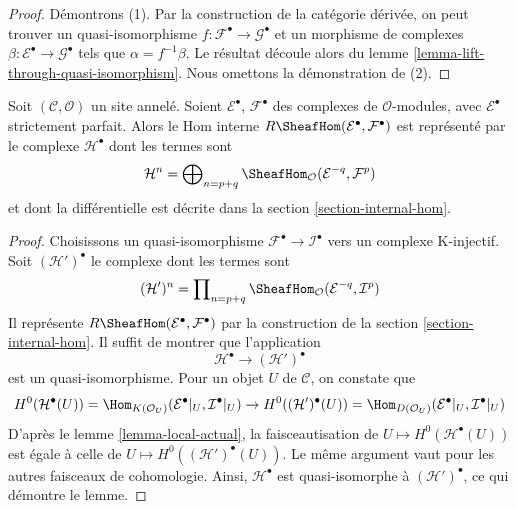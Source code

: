 \begin{proof}
Démontrons (1). Par la construction de la catégorie dérivée, on peut trouver
un quasi-isomorphisme
$f : \mathcal{F}^\bullet \to \mathcal{G}^\bullet$ et un morphisme de
complexes $\beta : \mathcal{E}^\bullet \to \mathcal{G}^\bullet$ tels que
$\alpha = f^{-1}\beta$. Le résultat découle alors du lemme
\ref{lemma-lift-through-quasi-isomorphism}. Nous omettons la démonstration de
(2).
\end{proof}

\begin{lemma}
\label{lemma-Rhom-strictly-perfect}
Soit $(\mathcal{C}, \mathcal{O})$ un site annelé. Soient
$\mathcal{E}^\bullet$, $\mathcal{F}^\bullet$ des complexes de
$\mathcal{O}$-modules, avec $\mathcal{E}^\bullet$ strictement parfait. Alors le
Hom interne $R\SheafHom(\mathcal{E}^\bullet, \mathcal{F}^\bullet)$ est
représenté par le complexe $\mathcal{H}^\bullet$ dont les termes sont
$$
\mathcal{H}^n =
\bigoplus\nolimits_{n = p + q}
\SheafHom_\mathcal{O}(\mathcal{E}^{-q}, \mathcal{F}^p)
$$
et dont la différentielle est décrite dans la section
\ref{section-internal-hom}.
\end{lemma}

\begin{proof}
Choisissons un quasi-isomorphisme
$\mathcal{F}^\bullet \to \mathcal{I}^\bullet$ vers un complexe K-injectif.
Soit $(\mathcal{H}')^\bullet$ le complexe dont les termes sont
$$
(\mathcal{H}')^n =
\prod\nolimits_{n = p + q}
\SheafHom_\mathcal{O}(\mathcal{E}^{-q}, \mathcal{I}^p)
$$
Il représente $R\SheafHom(\mathcal{E}^\bullet, \mathcal{F}^\bullet)$ par la
construction de la section \ref{section-internal-hom}. Il suffit de montrer
que l'application
$$
\mathcal{H}^\bullet \longrightarrow (\mathcal{H}')^\bullet
$$
est un quasi-isomorphisme. Pour un objet $U$ de $\mathcal{C}$, on constate que
$$
H^0(\mathcal{H}^\bullet(U)) =
\Hom_{K(\mathcal{O}_U)}(\mathcal{E}^\bullet|_U, \mathcal{I}^\bullet|_U)
\to
H^0((\mathcal{H}')^\bullet(U)) =
\Hom_{D(\mathcal{O}_U)}(\mathcal{E}^\bullet|_U, \mathcal{I}^\bullet|_U)
$$
D'après le lemme \ref{lemma-local-actual}, la faisceautisation de
$U \mapsto H^0(\mathcal{H}^\bullet(U))$ est égale à celle de
$U \mapsto H^0((\mathcal{H}')^\bullet(U))$. Le même argument vaut pour les
autres faisceaux de cohomologie. Ainsi, $\mathcal{H}^\bullet$ est
quasi-isomorphe à $(\mathcal{H}')^\bullet$, ce qui démontre le lemme.
\end{proof}

